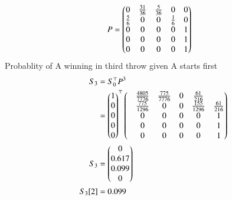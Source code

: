 \documentclass[journal,12pt,twocolumn]{IEEEtran}
\begin{document}
\begin{align}
P &= \begin{pmatrix}
    0 & \frac{31}{36} & \frac{5}{36} & 0 & 0 \\
    \frac{5}{6} & 0 & 0 & \frac{1}{6} & 0 \\
    0 & 0 & 0 & 0 & 1 \\
    0 & 0 & 0 & 0 & 1 \\
    0 & 0 & 0 & 0 & 1
\end{pmatrix}
\end{align}
Probablity of A winning in third throw given A starts first\\
\begin{align}
S_3 &= S_0^{\top}P^3\\
&= \begin{pmatrix} 1\\ 0\\0\\0\\0\\\end{pmatrix}^{\top}\begin{pmatrix}
     & \frac{4805}{7776} & \frac{775}{7776} & 0 & \frac{61}{216} \\
     & \frac{775}{1296} & 0 & 0 & \frac{155}{1296} & \frac{61}{216} \\
     & 0 & 0 & 0 & 0 & 1 \\
     & 0 & 0 & 0 & 0 & 1 \\
     & 0 & 0 & 0 & 0 & 1
\end{pmatrix}\\
S_3 &= \begin{pmatrix}0\\ 0.617\\0.099\\0\end{pmatrix}\\
S_3[2] &= 0.099
\end{align}
\end{document}
